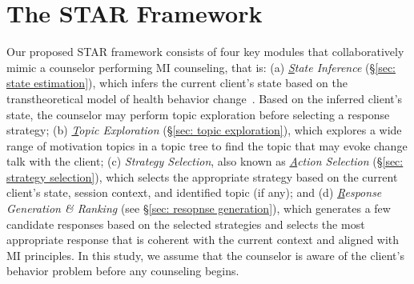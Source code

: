 \section{The STAR Framework}
\label{sec:counselor}
Our proposed STAR framework consists of four key modules that collaboratively mimic a counselor performing MI counseling, that is: (a) {\em \underline{S}tate Inference} (§\ref{sec: state estimation}), which infers the current client's state based on the transtheoretical model of health behavior change~\citep{prochaska2005transtheoretical,prochaska2008initial}. Based on the inferred client's state, the counselor may perform topic exploration before selecting a response strategy; (b) {\em \underline{T}opic Exploration} (§\ref{sec: topic exploration}), which explores a wide range of motivation topics in a topic tree to find the topic that may evoke change talk with the client; (c) {\em Strategy Selection}, also known as {\em \underline{A}ction Selection} (§\ref{sec: strategy selection}), which selects the appropriate strategy based on the current client's state, session context, and identified topic (if any); and (d) {\em \underline{R}esponse Generation \& Ranking} (see §\ref{sec: resopnse generation}), which generates a  few candidate responses based on the selected strategies and selects the most appropriate response that is coherent with the current context and aligned with MI principles.  In this study, we assume that the counselor is aware of the client's behavior problem before any counseling begins.


